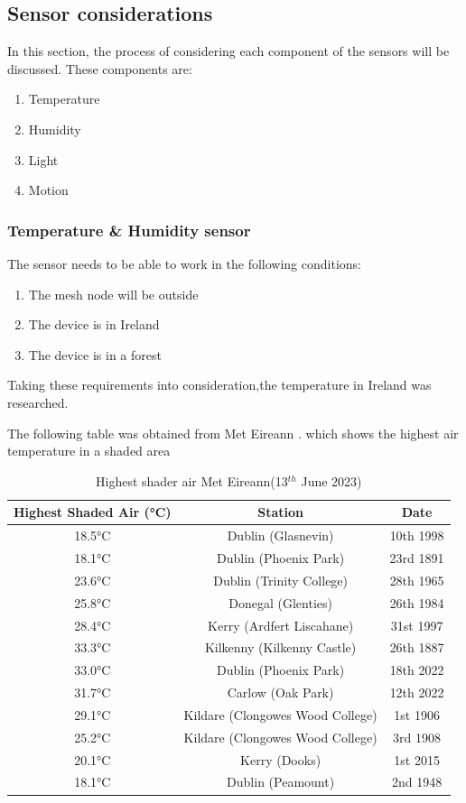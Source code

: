 \subsection{Sensor considerations}
In this section, the process of  considering each component of the sensors will be discussed.
These components are:
\begin{enumerate}
	\item Temperature
	\item Humidity
	\item Light
	\item Motion
\end{enumerate}
\subsubsection{Temperature \& Humidity sensor}
The sensor needs to be able to work in the following conditions:
\begin{enumerate}
	\item The mesh node will be outside
	\item The device is in Ireland		\item The device is in a forest
\end{enumerate}
Taking these requirements into consideration,the temperature in Ireland was researched.

The following table was obtained from Met Eireann \cite{Eirrean}. which shows  the highest air temperature in a  shaded area
\begin{table}[h!]
	\begin{tabular}{ | c | c | c | }
		\hline
		Highest Shaded Air (°C) & Station & Date \\ \hline
		18.5°C & Dublin (Glasnevin) & 10th 1998 \\ \hline
		18.1°C & Dublin (Phoenix Park) & 23rd 1891 \\ \hline
		23.6°C & Dublin (Trinity College) & 28th 1965 \\ \hline
		25.8°C & Donegal (Glenties) & 26th 1984 \\ \hline
		28.4°C & Kerry (Ardfert Liscahane) & 31st 1997 \\ \hline
		33.3°C & Kilkenny (Kilkenny Castle) & 26th 1887 \\ \hline
		33.0°C & Dublin (Phoenix Park) & 18th 2022 \\ \hline
		31.7°C & Carlow (Oak Park) & 12th 2022 \\ \hline
		29.1°C & Kildare (Clongowes Wood College) & 1st 1906 \\ \hline
		25.2°C & Kildare (Clongowes Wood College) & 3rd 1908 \\ \hline
		20.1°C & Kerry (Dooks) & 1st 2015 \\ \hline
		18.1°C & Dublin (Peamount) & 2nd 1948 \\ \hline
		\end{tabular}
		\caption{Highest shader air Met Eireann(13$^{th}$ June 2023)}
		\label{Highest shader air Met eirrean}
	\end{table}


